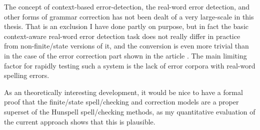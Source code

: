 \documentclass[officiallayout]{unihelcompling}
\begin{document}
The concept of context-based error-detection, the real-word error detection,
and other forms of grammar correction has not been dealt of a very large-scale
in this thesis. That is an exclusion I have done partly on purpose, but in fact
the basic context-aware real-word error detection task does not really differ
in practice from non-finite\-/state versions of it, and the conversion is even
more trivial than in the case of the error correction part shown in the article
. The main limiting factor for rapidly testing
such a system is the lack of error corpora with real-word spelling errors.

As an theoretically interesting development, it would be nice to have a formal
proof that the finite\-/state spell\-/checking and correction models are a proper
superset of the Hunspell spell\-/checking methods, as my quantitative
evaluation of the current approach shows that this is plausible.



\end{document}
